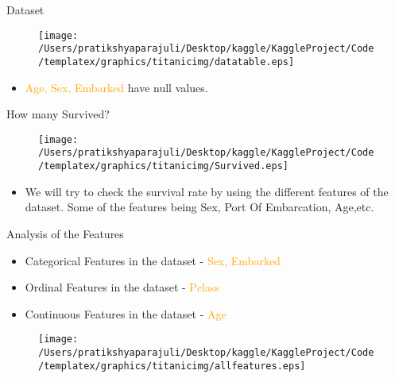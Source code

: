 \documentclass[
 size=14pt,
 paper=smartboard,  %
 mode=present, 		%
 display=slides, 	%
 style=tuliplab,  	%
 pauseslide,
 fleqn,leqno]{powerdot}
\begin{document}
\begin{slide}{Dataset}
 
  \begin{figure}
    \centering
    \centerline{\texttt{[image: /Users/pratikshyaparajuli/Desktop/kaggle/KaggleProject/Code/templatex/graphics/titanicimg/datatable.eps]}}
  \end{figure}
  \begin{itemize}
    \item
    \textcolor{orange}{Age, Sex, Embarked} have null values.
    \end{itemize}
  \end{slide}
\begin{slide}{How many Survived?}
 
  \begin{figure}
    \centering
    \centerline{\texttt{[image: /Users/pratikshyaparajuli/Desktop/kaggle/KaggleProject/Code/templatex/graphics/titanicimg/Survived.eps]}}
  \end{figure}
  \begin{itemize}
    \item
    We will try to check the survival rate by using the different features of the dataset. Some of the features being Sex, Port Of Embarcation, Age,etc.
    \end{itemize}
  \end{slide}
\begin{slide}{Analysis of the Features}
\begin{itemize}
\item
Categorical Features in the dataset - \textcolor{orange}{Sex, Embarked}
\item
Ordinal Features in the dataset - \textcolor{orange}{Pclass}
\item
Continuous Features in the dataset - \textcolor{orange}{Age}
\end{itemize}
\begin{figure}
  \centering
  \centerline{\texttt{[image: /Users/pratikshyaparajuli/Desktop/kaggle/KaggleProject/Code/templatex/graphics/titanicimg/allfeatures.eps]}}
\end{figure}
\end{slide}
\end{document}
